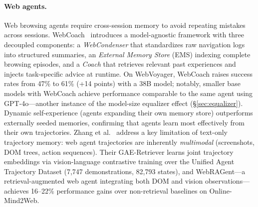 \documentclass[hf]{ceurart}
\begin{document}
\paragraph{Web agents.}
Web browsing agents require cross-session memory to avoid repeating
mistakes across sessions. WebCoach~\cite{webcoach2026} introduces a
model-agnostic framework with three decoupled components: a
\emph{WebCondenser} that standardizes raw navigation logs into
structured summaries, an \emph{External Memory Store} (EMS) indexing
complete browsing episodes, and a \emph{Coach} that retrieves
relevant past experiences and injects task-specific advice at runtime.
On WebVoyager, WebCoach raises success rates from 47\% to 61\%
(+14 points) with a 38B model; notably, smaller base models with
WebCoach achieve performance comparable to the same agent using
GPT-4o---another instance of the model-size equalizer effect
(\S\ref{sec:equalizer}). Dynamic self-experience (agents expanding
their own memory store) outperforms externally seeded memories,
confirming that agents learn most effectively from their own
trajectories.
Zhang et al.~\cite{multimodaltraj2026} address a key limitation of
text-only trajectory memory: web agent trajectories are inherently
\emph{multimodal} (screenshots, DOM trees, action sequences).
Their GAE-Retriever learns joint trajectory embeddings via
vision-language contrastive training over the Unified Agent
Trajectory Dataset (7,747 demonstrations, 82,793 states), and
WebRAGent---a retrieval-augmented web agent integrating both DOM
and vision observations---achieves 16--22\% performance gains over
non-retrieval baselines on Online-Mind2Web.
\end{document}
